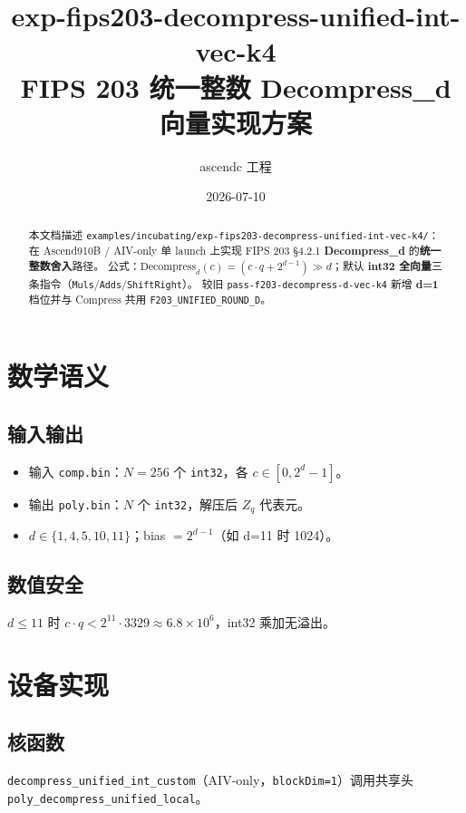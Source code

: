 \documentclass[UTF8,a4paper,11pt]{ctexart}
\title{exp-fips203-decompress-unified-int-vec-k4\\FIPS 203 统一整数 Decompress\_d 向量实现方案}
\author{ascendc 工程}
\date{2026-07-10}
\begin{document}
\maketitle

\begin{abstract}
本文档描述 \texttt{examples/incubating/exp-fips203-decompress-unified-int-vec-k4/}：
在 Ascend910B / AIV-only 单 launch 上实现 FIPS 203 §4.2.1 \textbf{Decompress\_d} 的\textbf{统一整数舍入}路径。
公式：$\text{Decompress}_d(c)=(c\cdot q+2^{d-1})\gg d$；默认 \textbf{int32 全向量}三条指令（\texttt{Muls}/\texttt{Adds}/\texttt{ShiftRight}）。
较旧 \texttt{pass-f203-decompress-d-vec-k4} 新增 \textbf{d=1} 档位并与 Compress 共用 \texttt{F203\_UNIFIED\_ROUND\_D}。
\end{abstract}

\section{数学语义}

\subsection{输入输出}
\begin{itemize}
  \item 输入 \texttt{comp.bin}：$N=256$ 个 \texttt{int32}，各 $c\in[0,2^d-1]$。
  \item 输出 \texttt{poly.bin}：$N$ 个 \texttt{int32}，解压后 $Z_q$ 代表元。
  \item $d\in\{1,4,5,10,11\}$；bias $=2^{d-1}$（如 d=11 时 1024）。
\end{itemize}

\subsection{数值安全}
$d\le 11$ 时 $c\cdot q < 2^{11}\cdot 3329 \approx 6.8\times 10^6$，int32 乘加无溢出。

\section{设备实现}

\subsection{核函数}
\texttt{decompress\_unified\_int\_custom}（AIV-only，\texttt{blockDim=1}）调用共享头
\texttt{poly\_decompress\_unified\_local}。
\end{document}
